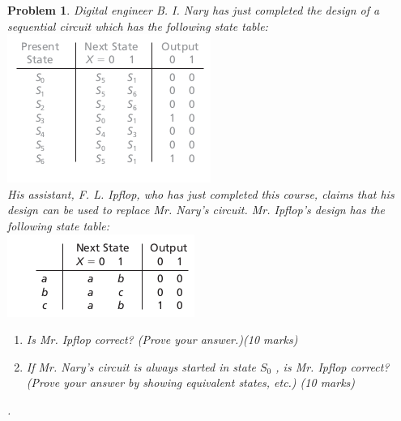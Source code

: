 \documentclass[twocolumn]{article}
\newtheorem{prob}{Problem}
\begin{document}
\begin{prob}
  Digital engineer B. I. Nary has just completed the design of a sequential circuit
  which has the following state table:\\
  \includegraphics[width=\linewidth]{fig-15.3a.png}\\
  His assistant, F. L. Ipflop, who has just completed this course, claims that
his design can be used to replace Mr. Nary’s circuit. Mr. Ipflop’s design has
the following state table:\\
\includegraphics[width=\linewidth]{fig-15.3b.png}\\
\begin{enumerate}
\item Is Mr. Ipflop correct? (Prove your answer.)(10 marks)
\item If Mr. Nary’s circuit is always started in state $S_0$ , is Mr. Ipflop correct? (Prove
  your answer by showing equivalent states, etc.) (10 marks)
  \end{enumerate} .
\end{prob}
\end{document}
